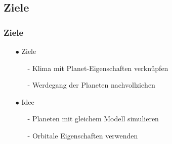 \documentclass[ngerman]{beamer}
\begin{document}
\begin{frame}
%	

\end{frame}

\subsection{Ziele}
\begin{frame}
\frametitle{Ziele}
\begin{itemize}

	\item[$\bullet$] Ziele
	\begin{itemize}
		\item[-] Klima mit Planet-Eigenschaften verknüpfen
		\item[-] Werdegang der Planeten nachvollziehen
	\end{itemize}

	\item[$\bullet$] Idee
	\begin{itemize}
		\item[-] Planeten mit gleichem Modell simulieren
		\item[-] Orbitale Eigenschaften verwenden
	\end{itemize}

\end{itemize}
\end{frame}
\end{document}
